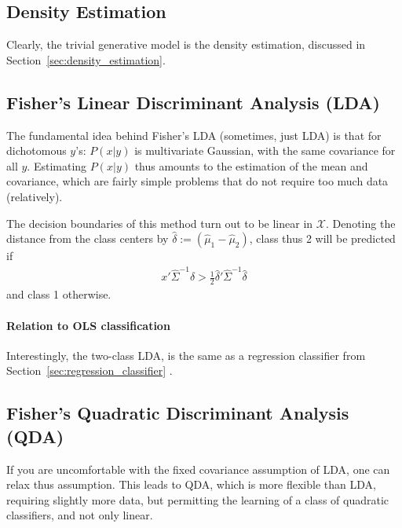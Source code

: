 \documentclass[12pt,a4paper]{article}
\theoremstyle{plain}
\theoremstyle{definition}
\newcommand{\dist}{P}
\newcommand{\featureS}{\mathcal{X}}
\begin{document}
\subsection{Density Estimation}
Clearly, the trivial generative model is the density estimation, discussed in Section~\ref{sec:density_estimation}.


\subsection{Fisher's Linear Discriminant Analysis (LDA)}
\label{sec:lda}
The fundamental idea behind Fisher's LDA (sometimes, just LDA) is that for dichotomous $y$'s: $\dist(x|y)$ is multivariate Gaussian, with the same covariance for all $y$.
Estimating $\dist(x|y)$ thus amounts to the estimation of the mean and covariance, which are fairly simple problems that do not require too much data (relatively).

The decision boundaries of this method turn out to be linear in $\featureS$. 
Denoting the distance from the class centers by $\hat{\delta}:=(\hat{\mu}_1-\hat{\mu}_2)$, class thus 2 will be predicted if 
\begin{align}
	x' \hat{\Sigma}^{-1} \hat{\delta} > \frac{1}{2} \hat{\delta}' \hat{\Sigma}^{-1} \hat{\delta}
\end{align}
and class 1 otherwise.


\paragraph{Relation to OLS classification}
Interestingly, the two-class LDA, is the same as a regression classifier from  Section~\ref{sec:regression_classifier} \cite[Eq. 4.11 ]{hastie_elements_2003}.



\subsection{Fisher's Quadratic Discriminant Analysis (QDA)}
If you are uncomfortable with the fixed covariance assumption of LDA, one can relax thus assumption.
This leads to QDA, which is more flexible than LDA, requiring slightly more data, but permitting the learning of a class of quadratic classifiers, and not only linear.
\end{document}
